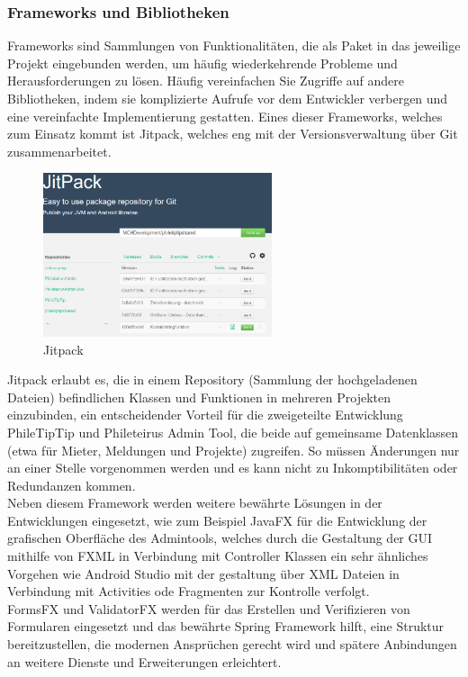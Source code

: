 
\subsubsection{Frameworks und Bibliotheken}

Frameworks sind Sammlungen von Funktionalitäten, die als Paket in das jeweilige Projekt eingebunden werden, um häufig wiederkehrende Probleme und Herausforderungen zu lösen. Häufig vereinfachen Sie Zugriffe auf andere Bibliotheken, indem sie komplizierte Aufrufe vor dem Entwickler verbergen und eine vereinfachte Implementierung gestatten. Eines dieser Frameworks, welches zum Einsatz kommt ist Jitpack, welches eng mit der Versionsverwaltung über Git zusammenarbeitet.\\

\begin{figure}[!h]
\centering
\includegraphics[width=0.6\textwidth]{jitpack}
\caption{Jitpack}
\end{figure}

Jitpack erlaubt es, die in einem Repository (Sammlung der hochgeladenen Dateien) befindlichen Klassen und Funktionen in mehreren Projekten einzubinden, ein entscheidender Vorteil für die zweigeteilte Entwicklung PhileTipTip und Phileteirus Admin Tool, die beide auf gemeinsame Datenklassen (etwa für Mieter, Meldungen und Projekte) zugreifen. So müssen Änderungen nur an einer Stelle vorgenommen werden und es kann nicht zu Inkomptibilitäten oder Redundanzen kommen.\\

Neben diesem Framework werden weitere bewährte Lösungen in der Entwicklungen eingesetzt, wie zum Beispiel JavaFX für die Entwicklung der grafischen Oberfläche des Admintools, welches durch die Gestaltung der GUI mithilfe von FXML in Verbindung mit Controller Klassen ein sehr ähnliches Vorgehen wie Android Studio mit der gestaltung über XML Dateien in Verbindung mit Activities ode Fragmenten zur Kontrolle verfolgt.\\ 

FormsFX und ValidatorFX werden für das Erstellen und Verifizieren von Formularen eingesetzt und das bewährte Spring Framework hilft, eine Struktur bereitzustellen, die modernen Ansprüchen gerecht wird und spätere Anbindungen an weitere Dienste und Erweiterungen erleichtert.\\